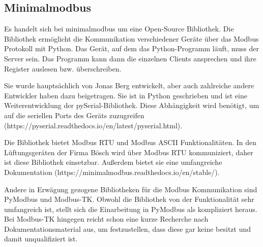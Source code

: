 \subsection{Minimalmodbus}
Es handelt sich bei minimalmodbus um eine Open-Source Bibliothek. Die Bibliothek ermöglicht die Kommunikation verschiedener Geräte über das Modbus Protokoll mit Python. Das Gerät, auf dem das Python-Programm läuft, muss der Server sein. Das Programm kann dann die einzelnen Clients ansprechen und ihre Register auslesen bzw. überschreiben.

Sie wurde hauptsächlich von Jonas Berg entwickelt, aber auch zahlreiche andere Entwickler haben dazu beigetragen. Sie ist in Python geschrieben und ist eine Weiterentwicklung der pySerial-Bibliothek. Diese Abhängigkeit wird benötigt, um auf die seriellen Ports des Geräts zuzugreifen (https://pyserial.readthedocs.io/en/latest/pyserial.html). 

Die Bibliothek bietet Modbus RTU und Modbus ASCII Funktionalitäten. In den Lüftungsgeräten der Firma Bösch wird über Modbus RTU kommuniziert, daher ist diese Bibliothek einsetzbar. Außerdem bietet sie eine umfangreiche Dokumentation (https://minimalmodbus.readthedocs.io/en/stable/). 

Andere in Erwägung gezogene Bibliotheken für die Modbus Kommunikation sind PyModbus und Modbus-TK. Obwohl die Bibliothek von der Funktionalität sehr umfangreich ist, stellt sich die Einarbeitung in PyModbus als kompliziert heraus. Bei Modbus-TK hingegen reicht schon eine kurze Recherche nach Dokumentationsmaterial aus, um festzustellen, dass diese gar keine besitzt und damit unqualifiziert ist.

